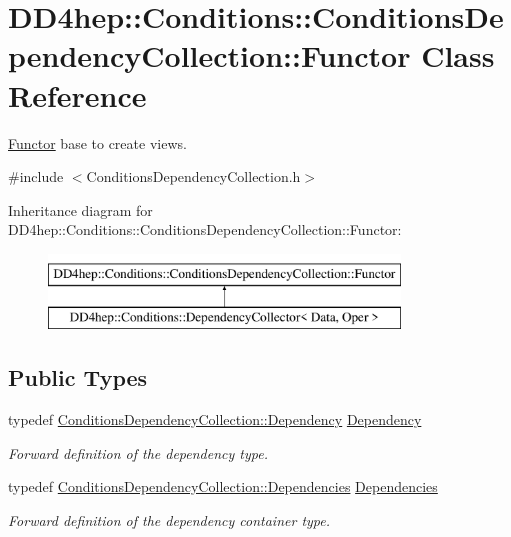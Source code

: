 \hypertarget{class_d_d4hep_1_1_conditions_1_1_conditions_dependency_collection_1_1_functor}{}\section{D\+D4hep\+:\+:Conditions\+:\+:Conditions\+Dependency\+Collection\+:\+:Functor Class Reference}
\label{class_d_d4hep_1_1_conditions_1_1_conditions_dependency_collection_1_1_functor}


\hyperlink{class_d_d4hep_1_1_conditions_1_1_conditions_dependency_collection_1_1_functor}{Functor} base to create views.  




{\ttfamily \#include $<$Conditions\+Dependency\+Collection.\+h$>$}

Inheritance diagram for D\+D4hep\+:\+:Conditions\+:\+:Conditions\+Dependency\+Collection\+:\+:Functor\+:\begin{figure}[H]
\begin{center}
\leavevmode
\includegraphics[height=2.000000cm]{class_d_d4hep_1_1_conditions_1_1_conditions_dependency_collection_1_1_functor}
\end{center}
\end{figure}
\subsection*{Public Types}
\begin{DoxyCompactItemize}
\item 
typedef \hyperlink{class_d_d4hep_1_1_conditions_1_1_conditions_dependency_collection_a87252585d3e17ae82813c039b1b47e8a}{Conditions\+Dependency\+Collection\+::\+Dependency} \hyperlink{class_d_d4hep_1_1_conditions_1_1_conditions_dependency_collection_1_1_functor_af969f8adeb10039bf5d5d2b2751fc45b}{Dependency}
\begin{DoxyCompactList}\small\item\em Forward definition of the dependency type. \end{DoxyCompactList}\item 
typedef \hyperlink{class_d_d4hep_1_1_conditions_1_1_conditions_dependency_collection_a7fb4072b6036f59389b929e312e2679c}{Conditions\+Dependency\+Collection\+::\+Dependencies} \hyperlink{class_d_d4hep_1_1_conditions_1_1_conditions_dependency_collection_1_1_functor_adaf7b6e0ec9fa1b67ee3b24924780152}{Dependencies}
\begin{DoxyCompactList}\small\item\em Forward definition of the dependency container type. \end{DoxyCompactList}\end{DoxyCompactItemize}


